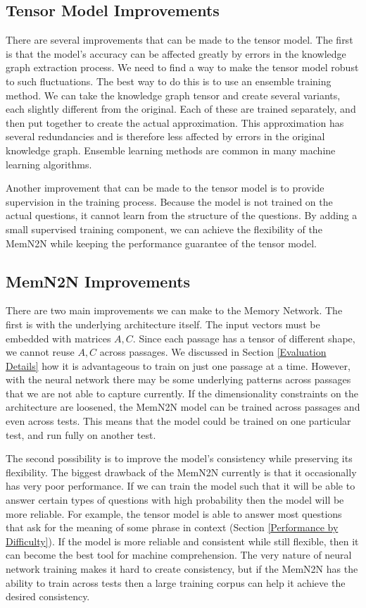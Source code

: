 \documentclass[pageno]{jpaper}
\begin{document}
\subsection{Tensor Model Improvements}
\label{Tensor Model Improvements}

There are several improvements that can be made to the tensor model. The first
is that the model's accuracy can be affected greatly by errors in the knowledge
graph extraction process. We need to find a way to make the tensor model robust
to such fluctuations. The best way to do this is to use an ensemble training
method. We can take the knowledge graph tensor and create several variants, each
slightly different from the original. Each of these are trained separately, and
then put together to create the actual approximation. This approximation has
several redundancies and is therefore less affected by errors in the original
knowledge graph. Ensemble learning methods are common in many machine learning
algorithms.

Another improvement that can be made to the tensor model is to provide
supervision in the training process. Because the model is not trained on the
actual questions, it cannot learn from the structure of the questions. By adding
a small supervised training component, we can achieve the flexibility of the
MemN2N while keeping the performance guarantee of the tensor model.

\subsection{MemN2N Improvements}
\label{MemN2N Improvements}

There are two main improvements we can make to the Memory Network. The first is
with the underlying architecture itself. The input vectors must be embedded with
matrices $A,C$. Since each passage has a tensor of different shape, we cannot
reuse $A,C$ across passages. We discussed in Section \ref{Evaluation Details}
how it is advantageous to train on just one passage at a time. However, with the
neural network there may be some underlying patterns across passages that we are
not able to capture currently. If the dimensionality constraints on the
architecture are loosened, the MemN2N model can be trained across passages and
even across tests. This means that the model could be trained on one particular
test, and run fully on another test.

The second possibility is to improve the model's consistency while preserving
its flexibility. The biggest drawback of the MemN2N currently is that it
occasionally has very poor performance. If we can train the model such that it
will be able to answer certain types of questions with high probability then the
model will be more reliable. For example, the tensor model is able to answer
most questions that ask for the meaning of some phrase in context (Section
\ref{Performance by Difficulty}). If the model is more reliable and consistent
while still flexible, then it can become the best tool for machine
comprehension. The very nature of neural network training makes it hard to
create consistency, but if the MemN2N has the ability to train across tests then
a large training corpus can help it achieve the desired consistency.
\end{document}
